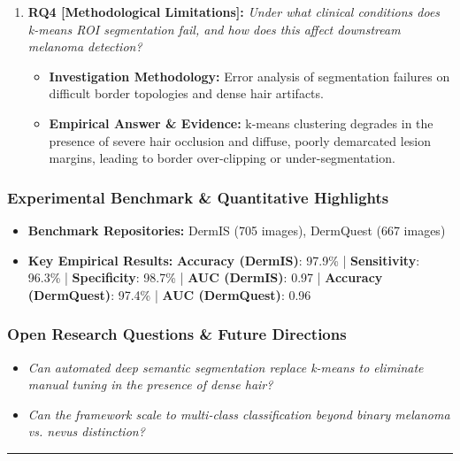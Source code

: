 \begin{enumerate}[label=\textbf{\arabic*.}, leftmargin=*]
\begin{itemize}[leftmargin=1.5em]
    \item \textbf{Empirical Answer \& Evidence:} Demonstrated exceptional consistency across datasets: AUC reached 0.97 on DermIS and 0.96 on DermQuest, with F1-scores of 96.3\% and 95.8\% respectively.
  \end{itemize}
  \item \textbf{RQ4 [Methodological Limitations]:} \textit{Under what clinical conditions does k-means ROI segmentation fail, and how does this affect downstream melanoma detection?}
  \begin{itemize}[leftmargin=1.5em]
    \item \textbf{Investigation Methodology:} Error analysis of segmentation failures on difficult border topologies and dense hair artifacts.
    \item \textbf{Empirical Answer \& Evidence:} k-means clustering degrades in the presence of severe hair occlusion and diffuse, poorly demarcated lesion margins, leading to border over-clipping or under-segmentation.
  \end{itemize}
\end{enumerate}

\subsubsection*{Experimental Benchmark \& Quantitative Highlights}
\begin{itemize}[leftmargin=*]
  \item \textbf{Benchmark Repositories:} DermIS (705 images), DermQuest (667 images)
  \item \textbf{Key Empirical Results:} \textbf{Accuracy (DermIS)}: 97.9\% \quad | \quad \textbf{Sensitivity}: 96.3\% \quad | \quad \textbf{Specificity}: 98.7\% \quad | \quad \textbf{AUC (DermIS)}: 0.97 \quad | \quad \textbf{Accuracy (DermQuest)}: 97.4\% \quad | \quad \textbf{AUC (DermQuest)}: 0.96
\end{itemize}

\subsubsection*{Open Research Questions \& Future Directions}
\begin{itemize}[leftmargin=*]
  \item \textit{Can automated deep semantic segmentation replace k-means to eliminate manual tuning in the presence of dense hair?}
  \item \textit{Can the framework scale to multi-class classification beyond binary melanoma vs. nevus distinction?}
\end{itemize}
\vspace{0.8em}\hrule\vspace{1.2em}
